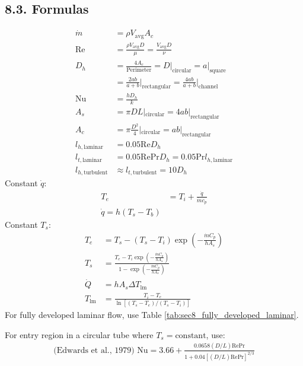 \documentclass[10pt]{article}
\begin{document}
\begin{multicols*}{2}
\subsection*{8.3. Formulas}
\vspace{-0.4cm}
\begin{align*}
    \dot{m} &= \rho V_{\text{avg}} A_c \\
    \text{Re} &= \frac{\rho V_{\text{avg}} D}{\mu}  = \frac{V_{\text{avg}} D}{\nu} \\
    D_h &= \frac{4 A_c}{\text{Perimeter}} = D\rvert_{\text{circular}} = a\rvert_{\text{square}}   \\
    &= \frac{2ab}{a + b} \bigg\rvert_{\text{rectangular}} = \frac{4ab}{a+b}\bigg\rvert_{\text{channel}} \\
    \text{Nu} &= \frac{hD_h}{k} \\ 
    A_s &= \pi D L|_{\text{circular}} = 4ab|_{\text{rectangular}} \\
    A_c &= \pi \frac{D^2}{4}|_{\text{circular}} = ab|_{\text{rectangular}} \\
    l_{h, \text{laminar}} &= 0.05 \text{Re} D_h \\
    l_{t, \text{laminar}} &= 0.05 \text{Re} \text{Pr} D_h = 0.05 \text{Pr} l_{h, \text{laminar}} \\
    l_{h, \text{turbulent}} &\approx l_{t, \text{turbulent}} = 10D_h 
\end{align*}
\vspace{-0.5cm}
Constant $\dot{q}$:
\begin{align*}
    T_e &= T_i + \frac{\dot{q}}{\dot{m} c_p} \\ 
    \dot{q} = h(T_s-T_b)
\end{align*}
Constant $T_s$:
\vspace{-0.5cm}
\begin{align*}
    T_e &= T_s - (T_s - T_i) \exp\left(-\frac{\dot{m} C_p}{h A_s}\right) \\
    T_s &=\frac{T_e - T_i \exp\left(-\frac{\dot{m} C_p}{h A_s}\right)}{1 - \exp\left(-\frac{\dot{m} C_p}{h A_s}\right)} \\
    \dot{Q} &= h A_s \Delta T_{\text{lm}} \\
    T_{\text{lm}} &= \frac{T_{i} - T_{e}}{\ln[(T_{s} - T_{e})/(T_{s} - T_{i})]} 
\end{align*}    
For fully developed laminar flow, use Table \ref{tab:sec8_fully_developed_laminar}.

For entry region in a circular tube where $T_s = \text{constant}$, use:
\vspace{-0.5cm}
\begin{align*}
    \text{(Edwards et al., 1979) } \text{Nu} = 3.66 + \frac{0.0658(D/L) \text{Re} \text{Pr}}{1 + 0.04[(D/L) \text{Re} \text{Pr}]^{2/3}} 
\end{align*}


\end{multicols*}
\end{document}
